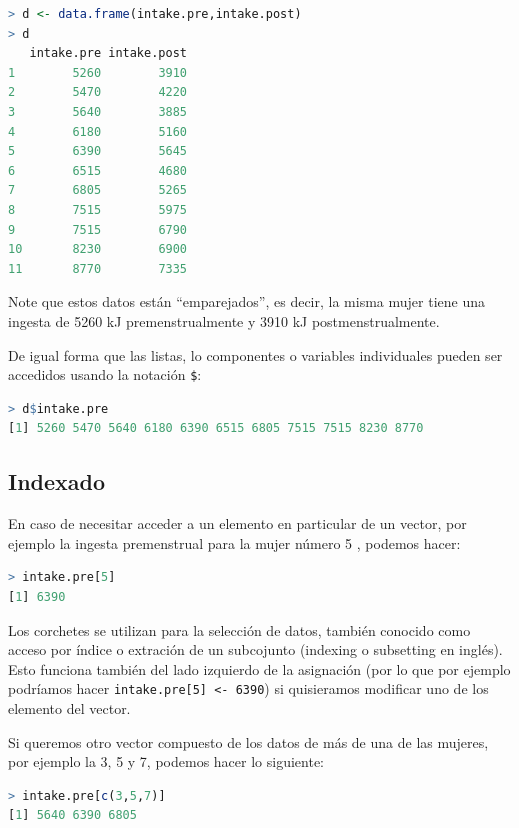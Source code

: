 \documentclass[spanish]{extbook}
\numberwithin{equation}{section}
\numberwithin{figure}{section}
\begin{document}
\begin{lstlisting}[language=R]
> d <- data.frame(intake.pre,intake.post)
> d
   intake.pre intake.post
1        5260        3910
2        5470        4220
3        5640        3885
4        6180        5160
5        6390        5645
6        6515        4680
7        6805        5265
8        7515        5975
9        7515        6790
10       8230        6900
11       8770        7335
\end{lstlisting}

Note que estos datos están ``emparejados'', es decir, la misma mujer tiene una
ingesta de 5260 kJ premenstrualmente y 3910 kJ postmenstrualmente.

De igual forma que las listas, lo componentes o variables individuales pueden
ser accedidos usando la notación \texttt{\$}:

\begin{lstlisting}[language=R]
> d$intake.pre
[1] 5260 5470 5640 6180 6390 6515 6805 7515 7515 8230 8770
\end{lstlisting}

\subsection{Indexado} \label{index}

En caso de necesitar acceder a un elemento en particular de un vector, por
ejemplo la ingesta premenstrual para la mujer número 5 , podemos hacer:

\begin{lstlisting}[language=R]
> intake.pre[5]
[1] 6390
\end{lstlisting}

Los corchetes se utilizan para la selección de datos, también conocido como
acceso por índice o extración de un subcojunto (indexing o subsetting en
inglés). Esto funciona también del lado izquierdo de la asignación (por lo que
por ejemplo podríamos hacer \texttt{intake.pre[5] <- 6390}) si quisieramos
modificar uno de los elemento del vector.

Si queremos otro vector compuesto de los datos de más de una de las mujeres,
por ejemplo la 3, 5 y 7, podemos hacer lo siguiente:

\begin{lstlisting}[language=R]
> intake.pre[c(3,5,7)]
[1] 5640 6390 6805
\end{lstlisting}
\end{document}
